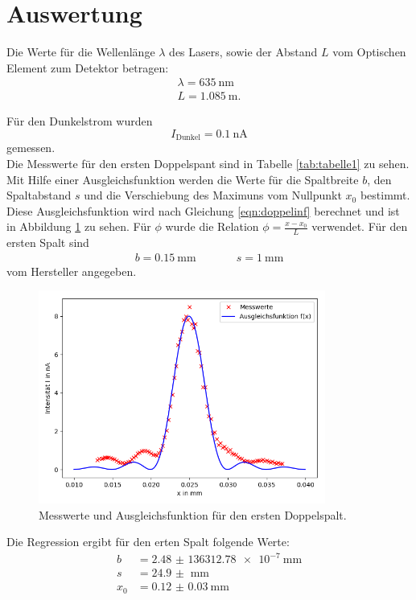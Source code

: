 \section{Auswertung}
\label{sec:Auswertung}
Die Werte für die Wellenlänge $\lambda$ des Lasers, sowie der Abstand $L$ vom Optischen Element zum
Detektor betragen:
\begin{align*}
  \lambda=\SI{635}{\nm}\\
  L=\SI{1,085}{\m}.
\end{align*}

Für den Dunkelstrom wurden
\begin{equation*}
   I_{\text{Dunkel}}=\SI{0.1}{\nA}
\end{equation*}
gemessen.\\

Die Messwerte für den ersten Doppelspant sind in Tabelle \ref{tab:tabelle1} zu sehen.
Mit Hilfe einer Ausgleichsfunktion werden die Werte für die Spaltbreite $b$, den
Spaltabstand $s$ und die Verschiebung des Maximuns vom Nullpunkt $x_{0}$ bestimmt.
Diese Ausgleichsfunktion wird nach Gleichung \ref{eqn:doppelinf} berechnet und ist in
Abbildung \ref{fig:plot1} zu sehen. Für $\phi$ wurde die Relation $\phi=\frac{x-x_{0}}{L}$
verwendet.
Für den ersten Spalt sind
\begin{align*}
  b=\SI{0,15}{\mm} &\;\;\;\;\;\;\;\;\;\; s=\SI{1}{\mm}
\end{align*}
vom Hersteller angegeben.


\begin{figure}
  \centering
  \includegraphics[height=7cm]{Figure_1.png}
  \caption{Messwerte und Ausgleichsfunktion für den ersten Doppelspalt.}
  \label{fig:plot1}
\end{figure}

Die Regression ergibt für den erten Spalt folgende Werte:
\begin{align*}
  b &=\SI{2.48(13631278)e-7}{\mm}\\
  s &=\SI{24.9(0)}{\mm}\\
  x_{0} &=\SI{0.12(3)}{\mm}
\end{align*}

